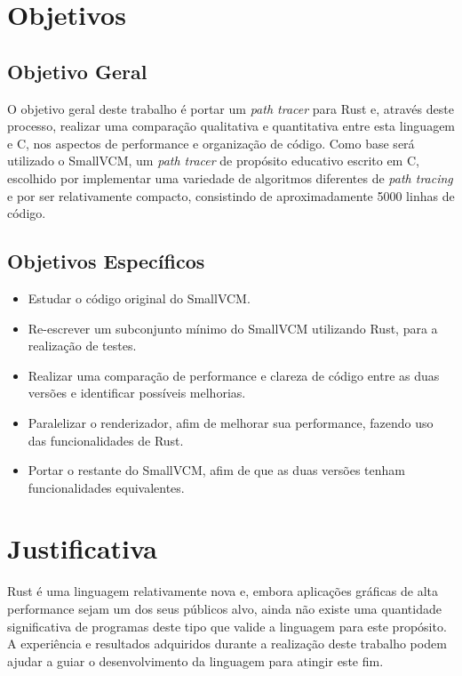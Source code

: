 \documentclass[tg]{mdtufsm}
\def\Cpp{{C\nolinebreak[4]\raisebox{.20ex}{\small\bf++}}}
\begin{document}
\section{Objetivos}

\subsection{Objetivo Geral}

O objetivo geral deste trabalho é portar um \emph{path tracer} para Rust e, através deste processo,
realizar uma comparação qualitativa e quantitativa entre esta linguagem e \Cpp, nos aspectos de
performance e organização de código. Como base será utilizado o SmallVCM\citep{smallvcm}, um
\emph{path tracer} de propósito educativo escrito em \Cpp, escolhido por implementar uma variedade
de algoritmos diferentes de \emph{path tracing} e por ser relativamente compacto, consistindo de
aproximadamente 5000 linhas de código.

\subsection{Objetivos Específicos}
\begin{itemize}
	\item Estudar o código original do SmallVCM.
	\item Re-escrever um subconjunto mínimo do SmallVCM utilizando Rust, para a realização de
		testes.
	\item Realizar uma comparação de performance e clareza de código entre as duas versões e
		identificar possíveis melhorias.
	\item Paralelizar o renderizador, afim de melhorar sua performance, fazendo uso das
		funcionalidades de Rust.
	\item Portar o restante do SmallVCM, afim de que as duas versões tenham funcionalidades
		equivalentes.
\end{itemize}

\section{Justificativa}

Rust é uma linguagem relativamente nova e, embora aplicações gráficas de alta performance sejam um
dos seus públicos alvo, ainda não existe uma quantidade significativa de programas deste tipo que
valide a linguagem para este propósito. A experiência e resultados adquiridos durante a realização
deste trabalho podem ajudar a guiar o desenvolvimento da linguagem para atingir este fim.
\end{document}

